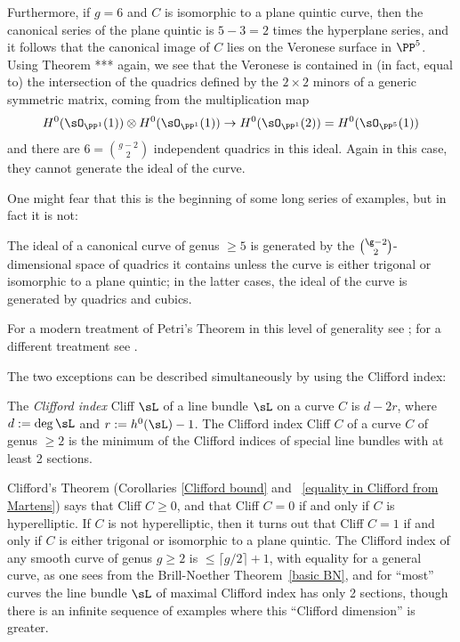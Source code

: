 Furthermore, if $g = 6$ and $C$ is isomorphic to a plane quintic curve, then the canonical series of the plane quintic is $5-3 = 2$ times the hyperplane series, and it follows that the canonical image of $C$ lies on the Veronese surface in $\PP^{5}$. Using Theorem *** again, we see that the Veronese is contained in (in fact, equal to) the intersection of the quadrics defined by the $2\times 2$ minors of a generic symmetric matrix, coming from the 
multiplication map 
$$
H^{0}(\sO_{\PP^{1}}(1))\otimes H^{0}(\sO_{\PP^{1}}(1)) \to H^{0}(\sO_{\PP^{1}}(2)) = H^{0}(\sO_{\PP^{5}}(1))
$$
and there are $6 = {g-2\choose 2}$ independent quadrics in this ideal. Again in this case, they cannot generate the ideal of the curve.

One might fear that this is the beginning of some long series of examples, but in fact it is not: 

\begin{theorem} [Petri]
The ideal of a canonical curve of genus $\geq 5$ is generated by the $\g-2\choose 2$-dimensional space of quadrics it contains unless the curve is either trigonal or isomorphic to a plane quintic; in the latter cases, the ideal of the curve is generated by quadrics and cubics.
\end{theorem}

For a modern treatment of Petri's Theorem in this level of generality see \cite{Schreyer}; for a different treatment see \cite{Arbarello-Sernesi}.

The two exceptions can be described simultaneously by using the Clifford index:

\begin{definition}
 The \emph{Clifford index} Cliff $\sL$ of a line bundle $\sL$ on a curve $C$ is $d-2r$, where $d := \deg \sL$ and $r :=  h^0(\sL)-1$. The Clifford index Cliff $C$ of
 a curve $C$ of genus $\geq 2$ is the minimum of the Clifford indices of special line bundles with at least 2 sections.
\end{definition}

Clifford's Theorem (Corollaries \ref{Clifford bound} and ~\ref{equality in Clifford from Martens}) says that Cliff $C \geq 0$, and that Cliff $C = 0$ if and only if $C$ is hyperelliptic. If $C$ is not hyperelliptic, then it turns out that Cliff $C=1$ if and only if $C$ is either trigonal or isomorphic to a plane quintic. The Clifford index of any smooth curve of genus $g\geq 2$ is $\leq \lceil g/2\rceil+1$, with equality for a general curve, as one sees from the Brill-Noether Theorem~\ref{basic BN}, and for ``most'' curves the line bundle $\sL$ of maximal Clifford index has only 2 sections, though there is an infinite sequence of examples where this
``Clifford dimension'' is greater.

